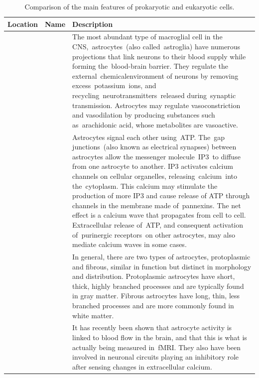 \documentclass[]{book}
\begin{document}
\begin{longtable}[t]{>{\raggedright\arraybackslash}p{5em}>{\raggedright\arraybackslash}p{5em}>{\raggedright\arraybackslash}p{40em}}
\caption{\label{tab:macroglia}Comparison of the main features of prokaryotic and eukaryotic cells.}\\
\toprule
Location & Name & Description\\
\midrule
\rowcolor{gray!6}   &  & The most abundant type of macroglial cell in the CNS, astrocytes (also called astroglia) have numerous projections that link neurons to their blood supply while forming the blood-brain barrier. They regulate the external chemicalenvironment of neurons by removing excess potassium ions, and recycling neurotransmitters released during synaptic transmission. Astrocytes may regulate vasoconstriction and vasodilation by producing substances such as arachidonic acid, whose metabolites are vasoactive.\\

 &  & Astrocytes signal each other using ATP. The gap junctions (also known as electrical synapses) between astrocytes allow the messenger molecule IP3 to diffuse from one astrocyte to another. IP3 activates calcium channels on cellular organelles, releasing calcium into the cytoplasm. This calcium may stimulate the production of more IP3 and cause release of ATP through channels in the membrane made of pannexins. The net effect is a calcium wave that propagates from cell to cell. Extracellular release of ATP, and consequent activation of purinergic receptors on other astrocytes, may also mediate calcium waves in some cases.\\

\rowcolor{gray!6}   &  & In general, there are two types of astrocytes, protoplasmic and fibrous, similar in function but distinct in morphology and distribution. Protoplasmic astrocytes have short, thick, highly branched processes and are typically found in gray matter. Fibrous astrocytes have long, thin, less branched processes and are more commonly found in white matter.\\

 & \multirow{-4}{5em}{\raggedright\arraybackslash Astrocytes} & It has recently been shown that astrocyte activity is linked to blood flow in the brain, and that this is what is actually being measured in fMRI. They also have been involved in neuronal circuits playing an inhibitory role after sensing changes in extracellular calcium.\\


\end{longtable}
\end{document}
